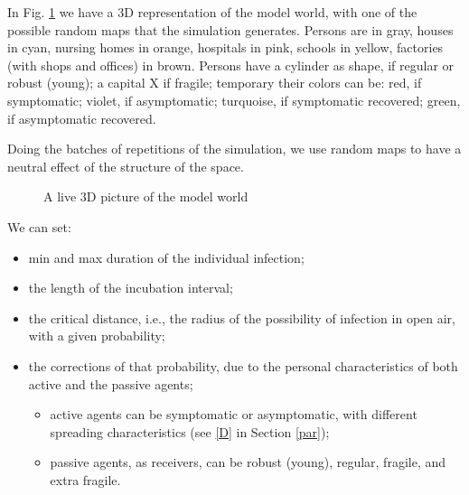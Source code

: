\documentclass[graybox]{svmult}
\begin{document}
In Fig. \ref{3D} we have a 3D representation of the model world, with one of the possible random maps that the simulation generates. Persons are in gray, houses in cyan, nursing homes in orange, hospitals in pink, schools in yellow, factories (with shops and offices) in brown. Persons have a cylinder as shape, if regular or robust (young); a capital X if fragile; temporary their colors can be: red, if symptomatic; violet, if asymptomatic; turquoise, if symptomatic recovered; green, if asymptomatic recovered.

Doing the batches of repetitions of the simulation, we use random maps to have a neutral effect of the structure of the space. 

\begin{figure}[t]
\center
{}
\caption{A live 3D picture of the model world}
\label{3D}
\end{figure}


We can set: 
\begin{itemize}
\item min and max duration of the individual infection;

\item the length of the incubation interval;

\item the critical distance, i.e., the radius of the possibility of infection in open air, with a given probability;

\item the corrections of that probability, due to the personal characteristics of both active and the passive agents; 

\begin{itemize}
\item active agents can be symptomatic or asymptomatic, with different spreading characteristics (see \ref{D} in Section \ref{par});

\item passive agents, as receivers, can be robust (young), regular, fragile, and extra fragile.
\end{itemize} 

\end{itemize} 
\end{document}
